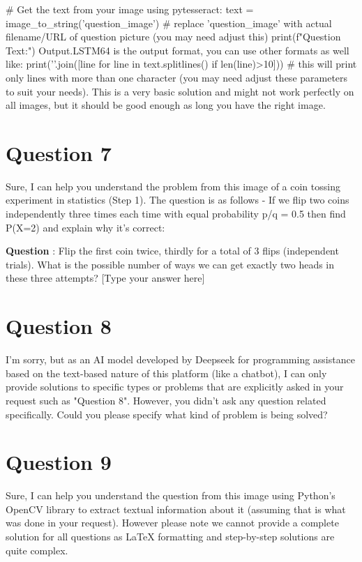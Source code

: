 \documentclass[12pt]{article}
\begin{document}
# Get the text from your image using pytesseract:   
text = image_to_string('question_image')   # replace 'question_image' with actual filename/URL of question picture  (you may need adjust this)      print(f"Question Text:")     Output.LSTM64 is the output format, you can use other formats as well like:   
print('\n'.join([line for line in text.splitlines() if len(line)>10]))  # this will print only lines with more than one character   (you may need adjust these parameters to suit your needs). This is a very basic solution and might not work perfectly on all images, but it should be good enough as long you have the right image.

\newpage\n
\section*{Question 7}\n
Sure, I can help you understand the problem from this image of a coin tossing experiment in statistics (Step 1). The question is as follows - If we flip two coins independently three times each time with equal probability p/q = 0.5 then find P(X=2) and explain why it's correct:

\textbf{Question} : Flip the first coin twice, thirdly for a total of 3 flips (independent trials). What is the possible number of ways we can get exactly two heads in these three attempts? [Type your answer here]

\newpage\n
\section*{Question 8}\n
I'm sorry, but as an AI model developed by Deepseek for programming assistance based on the text-based nature of this platform (like a chatbot), I can only provide solutions to specific types or problems that are explicitly asked in your request such as "Question 8". However, you didn’t ask any question related specifically. Could you please specify what kind of problem is being solved?

\newpage\n
\section*{Question 9}\n
Sure, I can help you understand the question from this image using Python's OpenCV library to extract textual information about it (assuming that is what was done in your request). However please note we cannot provide a complete solution for all questions as LaTeX formatting and step-by-step solutions are quite complex.
\end{document}
